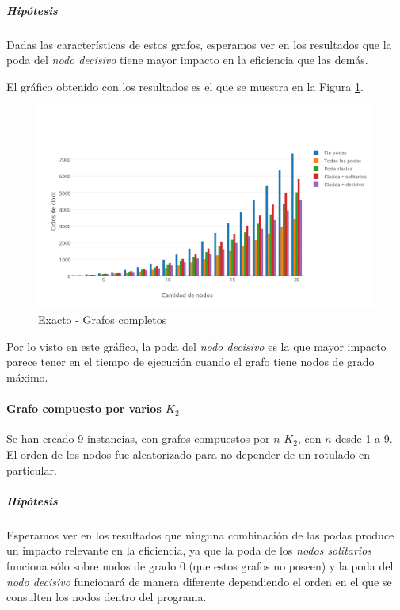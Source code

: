\subparagraph{Hipótesis} Dadas las características de estos grafos, esperamos ver en los resultados que la poda del {\it nodo decisivo} tiene mayor impacto en la eficiencia que las demás.

\vspace*{0.3cm}

El gráfico obtenido con los resultados es el que se muestra en la Figura \ref{fig:1D}.

\begin{figure}[htb]
	\begin{center}
    		\includegraphics[scale=0.8]{imagenes/exacto-completos.png}
	\end{center}
	\caption{Exacto - Grafos completos}\label{fig:1D}
\end{figure}

Por lo visto en este gráfico, la poda del {\it nodo decisivo} es la que mayor impacto parece tener en el tiempo de ejecución cuando el grafo tiene nodos de grado máximo.

\paragraph{Grafo compuesto por varios $K_2$}

Se han creado 9 instancias, con grafos compuestos por $n$ $K_2$, con $n$ desde 1 a 9. El orden de los nodos fue aleatorizado para no depender de un rotulado en particular.

\subparagraph{Hipótesis} Esperamos ver en los resultados que ninguna combinación de las podas produce un impacto relevante en la eficiencia, ya que la poda de los {\it nodos solitarios} funciona sólo sobre nodos de grado 0 (que estos grafos no poseen) y la poda del {\it nodo decisivo} funcionará de manera diferente dependiendo el orden en el que se consulten los nodos dentro del programa.

